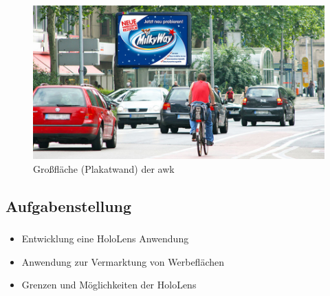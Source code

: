 \documentclass{beamer}
\begin{document}
\begin{frame}
    \frametitle{\insertsubsection}
    \begin{figure}
        \centering
        \includegraphics[width=\linewidth]{images/Billboard}
        \caption{Großfläche (Plakatwand) der awk~\cite{GrossflacheStandort:2017vl}\label{fig:Billboard}}
      \end{figure}
\end{frame}

\subsection{Aufgabenstellung}
\begin{frame}
    \frametitle{\insertsubsection}
    \begin{itemize}
        \item Entwicklung eine HoloLens Anwendung
        \item Anwendung zur Vermarktung von Werbeflächen
        \item Grenzen und Möglichkeiten der HoloLens        
    \end{itemize}
\end{frame}

    
\end{document}
